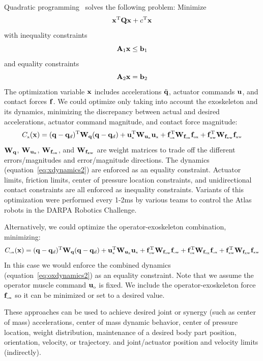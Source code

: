\documentclass[letterpaper,12pt,fullpage]{article}
\newcommand{\myo}{{\mbox {\tiny o}}}
\newcommand{\myx}{{\mbox {\tiny x}}}
\newcommand{\ox}{{\mbox {\tiny ox}}}
\newcommand{\ow}{{\mbox {\tiny ow}}}
\newcommand{\xw}{{\mbox {\tiny xw}}}
\begin{document}
Quadratic programming~\cite{Wikipedia} solves the following problem:
Minimize
\begin{equation}
{\bf x}^{{\rm T}} {\bf Q} {\bf x} + c^{{\rm T}} {\bf x}
\end{equation}
with inequality constraints
\begin{equation}
{\bf A}_1 {\bf x} \le {\bf b}_1
\end{equation}
and equality constraints
\begin{equation}
{\bf A}_2 {\bf x} = {\bf b}_2
\end{equation}
The optimization variable ${\bf x}$ includes accelerations $\ddot{{\bf q}}$, actuator
commands ${\bf u}$, and contact forces ${\bf f}$.
We could optimize only taking into account the exoskeleton and its dynamics,
minimizing the discrepancy between actual and desired accelerations, actuator command
magnitude, and contact force magnitude:
\begin{equation}
C_{\myx}(\vx) = (\vq - \vq_d)^{\tr} \mW_{\vq} (\vq - \vq_d)
+ \vu_{\myx}^{\tr} \mW_{\vu_{\myx}} \vu_{\myx}
+ \vf_{\ox}^{\tr} \mW_{\vf_{\ox}} \vf_{\ox}
+ \vf_{\xw}^{\tr} \mW_{\vf_{\xw}} \vf_{\xw}
\end{equation}
${\bf W}_{{\bf q}}$, $\mW_{\vu_{\myx}}$, $\mW_{\vf_{\ox}}$,
and $\mW_{\vf_{\xw}}$ are weight matrices to trade off the
different errors/magnitudes and error/magnitude directions.
The dynamics (equation~\ref{eq:xdynamics2}) are enforced as an equality constraint.
Actuator limits, friction limits, center of pressure location constraints,
and unidirectional contact constraints are all
enforced as inequality constraints.
Variants of this optimization
were performed every 1-2ms by various teams to control the
Atlas robots in the DARPA Robotics Challenge.

Alternatively, we could optimize the operator-exoskeleton combination,
minimizing:
\begin{equation}
C_{\ox}(\vx) = (\vq - \vq_d)^{\tr} \mW_{\vq} (\vq - \vq_d) 
+ \vu^{\tr}_{\myx} \mW_{\vu_{\myx}} \vu_{\myx}
+ \vf_{\ow}^{\tr} \mW_{\vf_{\ow}} \vf_{\ow}
+ \vf_{\ox}^{\tr} \mW_{\vf_{\ox}} \vf_{\ox}
+ \vf_{\xw}^{\tr} \mW_{\vf_{\xw}} \vf_{\xw}
\end{equation}
In this case we would enforce the combined 
dynamics (equation~\ref{eq:oxdynamics2}) as an equality constraint.
Note that we assume the operator muscle command
$\vu_{\myo}$ is fixed.
We include the operator-exoskeleton force $\vf_{\ox}$ so it can be minimized or set to
a desired value.

These approaches can be used to achieve desired joint or synergy (such as center
of mass) accelerations, center of mass dynamic behavior, center of pressure location,
weight distribution, maintenance of a desired body part position, orientation,
velocity, or trajectory. and joint/actuator position and velocity limits (indirectly).
\end{document}
